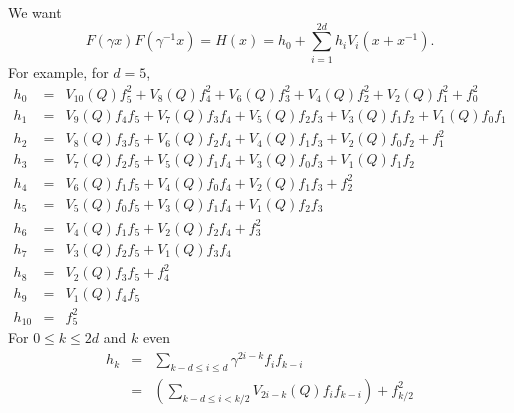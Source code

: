 \documentclass[a4paper]{article}
\begin{document}

We want 
\begin{displaymath}
  F(\gamma x)F(\gamma^{-1} x) = H(x) = h_0 + \sum_{i=1}^{2d} h_i V_i(x+x^{-1}).
\end{displaymath}
For example, for $d = 5$, 
\begin{eqnarray*}
h_0 & = & V_{10}(Q) f_{5}^2 + V_{8}(Q) f_{4}^2+ V_{6}(Q) f_{3}^2 + V_{4}(Q) f_{2}^2+ V_{2}(Q) f_{1}^2+ f_{0}^2  \\
h_1 & = & V_{9}(Q) f_{4} f_{5}+ V_{7}(Q) f_{3} f_{4}+ V_{5}(Q) f_{2} f_{3} + V_{3}(Q) f_{1} f_{2}+ V_{1}(Q) f_{0} f_{1}  \\
h_2 & = & V_{8}(Q) f_{3} f_{5}+ V_{6}(Q) f_{2} f_{4}+ V_{4}(Q) f_{1} f_{3} + V_{2}(Q) f_{0} f_{2}+ f_{1}^2  \\
h_3 & = & V_{7}(Q) f_{2} f_{5}+ V_{5}(Q) f_{1} f_{4}+ V_{3}(Q) f_{0} f_{3} + V_{1}(Q) f_{1} f_{2} \\
h_4 & = & V_{6}(Q) f_{1} f_{5}+ V_{4}(Q) f_{0} f_{4}+ V_{2}(Q) f_{1} f_{3} + f_{2}^2 \\
h_5 & = & V_{5}(Q) f_{0} f_{5}+ V_{3}(Q) f_{1} f_{4}+ V_{1}(Q) f_{2} f_{3} \\
h_6 & = & V_{4}(Q) f_{1} f_{5}+ V_{2}(Q) f_{2} f_{4}+ f_{3}^2 \\
h_7 & = & V_{3}(Q) f_{2} f_{5}+ V_{1}(Q) f_{3} f_{4}\\
h_8 & = & V_{2}(Q) f_{3} f_{5}+ f_{4}^2\\
h_9 & = & V_{1}(Q) f_{4} f_{5}\\
h_{10} & = & f_{5}^2
\end{eqnarray*}
For $0 \leq k \leq 2d$ and $k$ even
\begin{eqnarray*}
  h_k & = & \sum_{k-d \leq i \leq d} \gamma^{2i-k} f_i f_{k-i} \\ 
      & = & \left( \sum_{k-d \leq i < k/2} V_{2i-k}(Q) f_i f_{k-i} \right) +
            f_{k/2}^2 \\
\end{eqnarray*}
\end{document}
